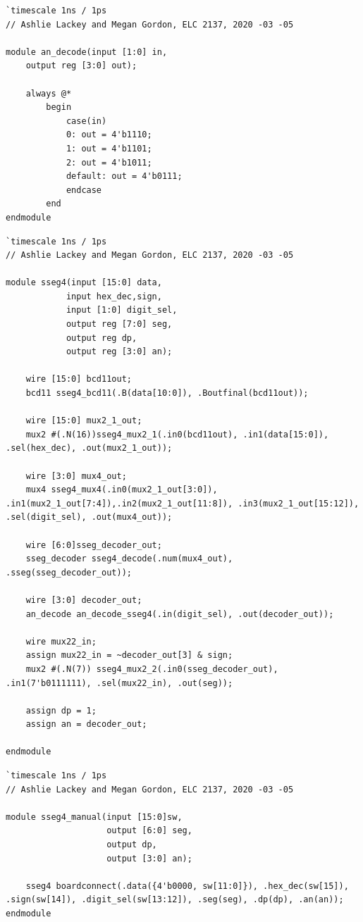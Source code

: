 \documentclass[11pt]{article}
\begin{document}
\begin{lstlisting}[style=Verilog,caption=andecoder Module Code,label=code:ex ]
`timescale 1ns / 1ps
// Ashlie Lackey and Megan Gordon, ELC 2137, 2020 -03 -05

module an_decode(input [1:0] in,
	output reg [3:0] out);
	
	always @*
		begin
			case(in)
			0: out = 4'b1110;
			1: out = 4'b1101;
			2: out = 4'b1011;
			default: out = 4'b0111;
			endcase
		end
endmodule
\end{lstlisting}

\begin{lstlisting}[style=Verilog,caption=sseg4 Module Code,label=code:ex ]
`timescale 1ns / 1ps
// Ashlie Lackey and Megan Gordon, ELC 2137, 2020 -03 -05

module sseg4(input [15:0] data,
			input hex_dec,sign,
			input [1:0] digit_sel,
			output reg [7:0] seg,
			output reg dp,
			output reg [3:0] an);

	wire [15:0] bcd11out;
	bcd11 sseg4_bcd11(.B(data[10:0]), .Boutfinal(bcd11out));
	
	wire [15:0] mux2_1_out;
	mux2 #(.N(16))sseg4_mux2_1(.in0(bcd11out), .in1(data[15:0]), .sel(hex_dec), .out(mux2_1_out));
	
	wire [3:0] mux4_out;
	mux4 sseg4_mux4(.in0(mux2_1_out[3:0]), .in1(mux2_1_out[7:4]),.in2(mux2_1_out[11:8]), .in3(mux2_1_out[15:12]), .sel(digit_sel), .out(mux4_out));
	
	wire [6:0]sseg_decoder_out;
	sseg_decoder sseg4_decode(.num(mux4_out), .sseg(sseg_decoder_out));
	
	wire [3:0] decoder_out;
	an_decode an_decode_sseg4(.in(digit_sel), .out(decoder_out));
	
	wire mux22_in;
	assign mux22_in = ~decoder_out[3] & sign;
	mux2 #(.N(7)) sseg4_mux2_2(.in0(sseg_decoder_out), .in1(7'b0111111), .sel(mux22_in), .out(seg));
	
	assign dp = 1;
	assign an = decoder_out;

endmodule
\end{lstlisting}

\begin{lstlisting}[style=Verilog,caption=sseg4 manual Module Code,label=code:ex ]
`timescale 1ns / 1ps
// Ashlie Lackey and Megan Gordon, ELC 2137, 2020 -03 -05

module sseg4_manual(input [15:0]sw,
					output [6:0] seg,
					output dp,
					output [3:0] an);
	
	sseg4 boardconnect(.data({4'b0000, sw[11:0]}), .hex_dec(sw[15]), .sign(sw[14]), .digit_sel(sw[13:12]), .seg(seg), .dp(dp), .an(an));              
endmodule
\end{lstlisting}
\end{document}

